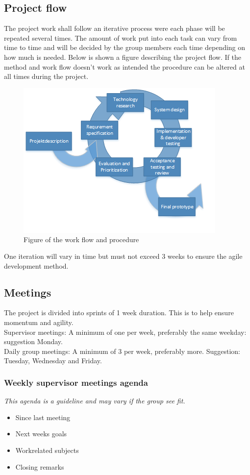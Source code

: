 \subsection{Project flow}
The project work shall follow an iterative process were each phase will be repeated several times. The amount of work put into each task can vary from time to time and will be decided by the group members each time depending on how much is needed. Below is shown a figure describing the project flow. If the method and work flow doesn't work as intended the procedure can be altered at all times during the project.
\begin{figure}[H]
\centering
\includegraphics[width=.7\textwidth]{billeder/iteration_fig.png}
\caption{Figure of the work flow and procedure}
\end{figure}
One iteration will vary in time but must not exceed 3 weeks to ensure the agile development method.\\

\subsection{Meetings}
The project is divided into sprints of 1 week duration. This is to help ensure momentum and agility.\\
Supervisor meetings: A minimum of one per week, preferably the same weekday: suggestion Monday.\\
Daily group meetings: A minimum of 3 per week, preferably more. Suggestion: Tuesday, Wednesday and Friday.

\subsubsection{Weekly supervisor meetings agenda}
\textit{This agenda is a guideline and may vary if the group see fit.}
\begin{itemize}
\item Since last meeting
\item Next weeks goals
\item Workrelated subjects
\item Closing remarks
\end{itemize}

